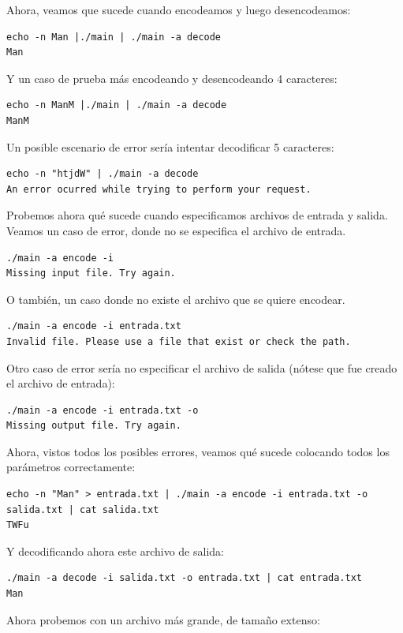 \documentclass[11pt]{article}
\begin{document}
        Ahora, veamos que sucede cuando encodeamos y luego desencodeamos:
        \begin{verbatim}
echo -n Man |./main | ./main -a decode
Man
        \end{verbatim}
        Y un caso de prueba más encodeando y desencodeando 4 caracteres:
        \begin{verbatim}
echo -n ManM |./main | ./main -a decode
ManM
        \end{verbatim}
        Un posible escenario de error sería intentar decodificar 5 caracteres:
        \begin{verbatim}
echo -n "htjdW" | ./main -a decode
An error ocurred while trying to perform your request.
        \end{verbatim}
        Probemos ahora qué sucede cuando especificamos archivos de entrada y salida.\\
        Veamos un caso de error, donde no se especifica el archivo de entrada.
        \begin{verbatim}
./main -a encode -i
Missing input file. Try again.     
        \end{verbatim}
        O también, un caso donde no existe el archivo que se quiere encodear.
        \begin{verbatim}
./main -a encode -i entrada.txt
Invalid file. Please use a file that exist or check the path.
        \end{verbatim}
        Otro caso de error sería no especificar el archivo de salida (nótese que fue creado el archivo de entrada):
        \begin{verbatim}
./main -a encode -i entrada.txt -o
Missing output file. Try again.
        \end{verbatim}
        Ahora, vistos todos los posibles errores, veamos qué sucede colocando todos los parámetros correctamente:
        \begin{verbatim}
echo -n "Man" > entrada.txt | ./main -a encode -i entrada.txt -o salida.txt | cat salida.txt
TWFu
        \end{verbatim}
        Y decodificando ahora este archivo de salida: 
        \begin{verbatim}
./main -a decode -i salida.txt -o entrada.txt | cat entrada.txt 
Man
        \end{verbatim}
        Ahora probemos con un archivo más grande, de tamaño extenso:
\end{document}
